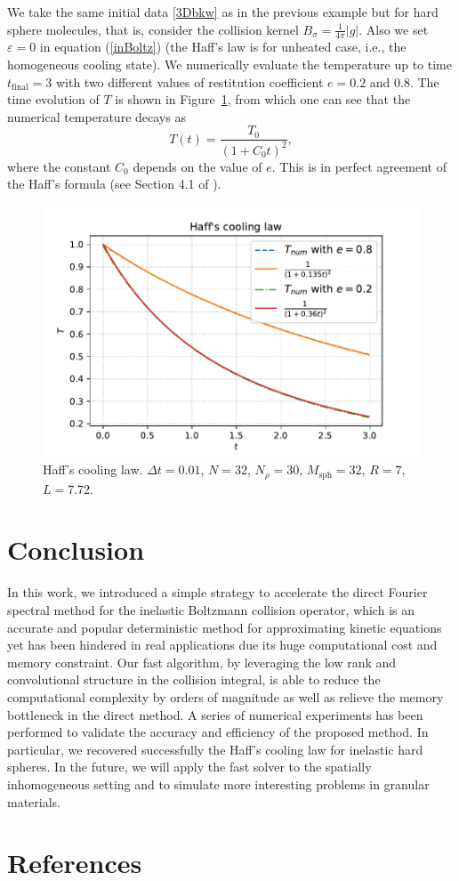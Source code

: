 \documentclass[review,times]{elsarticle}
\begin{document}
We take the same initial data \eqref{3Dbkw} as in the previous example but for hard sphere molecules, that is, consider the collision kernel $B_{\sigma} = \frac{1}{4\pi}|g|$. Also we set $\varepsilon=0$ in equation (\ref{inBoltz}) (the Haff's law is for unheated case, i.e., the homogeneous cooling state). We numerically evaluate the temperature up to time $t_\text{final}=3$ with two different values of restitution coefficient $e=0.2$ and $0.8$. The time evolution of $T$ is shown in Figure~\ref{Haff_cooling}, from which one can see that the numerical temperature decays as 
\begin{equation}
T(t) = \frac{T_0}{(1+C_0 t)^2},
\end{equation}
where the constant $C_0$ depends on the value of $e$. This is in perfect agreement of the Haff's formula (see Section 4.1 of \cite{NE}).

\begin{figure}[htp!]
  \centering
  \includegraphics[width = .8\linewidth]{Haff's_cooling}
  \caption{Haff's cooling law. $\Delta t=0.01$, $N=32$, $N_{\rho}=30$, $M_{\text{sph}}=32$, $R=7$, $L=7.72$.}
  \label{Haff_cooling}
\end{figure}


\section{Conclusion}

In this work, we introduced a simple strategy to accelerate the direct Fourier spectral method for the inelastic Boltzmann collision operator, which is an accurate and popular deterministic method for approximating kinetic equations yet has been hindered in real applications due its huge computational cost and memory constraint. Our fast algorithm, by leveraging the low rank and convolutional structure in the collision integral, is able to reduce the computational complexity by orders of magnitude as well as relieve the memory bottleneck in the direct method. A series of numerical experiments has been performed to validate the accuracy and efficiency of the proposed method. In particular, we recovered successfully the Haff's cooling law for inelastic hard spheres. In the future, we will apply the fast solver to the spatially inhomogeneous setting and to simulate more interesting problems in granular materials.




\section*{References}


\end{document}
